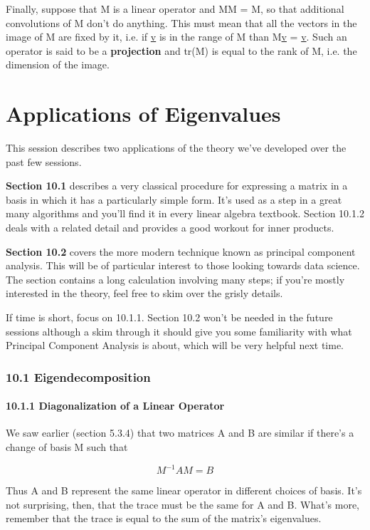 \documentclass[oneside,english]{amsbook}
\numberwithin{section}{chapter}
\theoremstyle{plain}
\theoremstyle{definition}
\begin{document}
Finally, suppose that M is a linear operator and MM = M, so that
additional convolutions of M don't do anything. This must mean that all
the vectors in the image of M are fixed by it, i.e. if \ul{v} is in the
range of M than M\ul{v} = \ul{v}. Such an operator is said to be a
\textbf{projection} and tr(M) is equal to the rank of M, i.e. the
dimension of the image.

\chapter{Applications of Eigenvalues}

This session describes two applications of the theory we've developed
over the past few sessions.

\textbf{Section 10.1} describes a very classical procedure for
expressing a matrix in a basis in which it has a particularly simple
form. It's used as a step in a great many algorithms and you'll find it
in every linear algebra textbook. Section 10.1.2 deals with a related
detail and provides a good workout for inner products.

\textbf{Section 10.2} covers the more modern technique known as
principal component analysis. This will be of particular interest to
those looking towards data science. The section contains a long
calculation involving many steps; if you're mostly interested in the
theory, feel free to skim over the grisly details.

If time is short, focus on 10.1.1. Section 10.2 won't be needed in the
future sessions although a skim through it should give you some
familiarity with what Principal Component Analysis is about, which will
be very helpful next time.

\subsection{10.1 Eigendecomposition}\label{eigendecomposition}

\subsubsection{10.1.1 Diagonalization of a Linear
	Operator}\label{diagonalization-of-a-linear-operator}

We saw earlier (section 5.3.4) that two matrices A and B are similar if
there's a change of basis M such that

\[M^{- 1}AM = B\]

Thus A and B represent the same linear operator in different choices of
basis. It's not surprising, then, that the trace must be the same for A
and B. What's more, remember that the trace is equal to the sum of the
matrix's eigenvalues.
\end{document}
